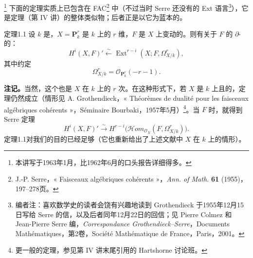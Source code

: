 \footnote{本讲写于1963年1月，比1962年6月的口头报告详细得多。}
下面的定理实质上已包含在 FAC\footnote{J.-P. Serre，« Faisceaux algébriques cohérents »，\emph{Ann. of Math.} \textbf{61} (1955)，197--278页。} 中（不过当时 Serre 还没有的 Ext 语言\footnote{编者注：喜欢数学史的读者会饶有兴趣地读到 Grothendieck 于1955年12月15日写给 Serre 的信，以及后者同年12月22日的回信；见 Pierre Colmez 和 Jean-Pierre Serre 编，\emph{Correspondance Grothendieck--Serre}，Documents Mathématiques，第2卷，Société Mathématique de France，Paris，2001。}），它是定理（第 IV 讲）的整体类似物；后者正是以它为蓝本的。
\begin{SGAresult}{定理}{1.1}
设 $k$ 是，$X=\mathbf P_k^r$ 是 $k$ 上的 $r$ 维，$F$ 是 $X$ 上变动的。则有关于 $F$ 的 $\partial$-的：
\[
 H^i(X,F)'\xleftarrow{\sim}\operatorname{Ext}^{r-i}(X;F,\Omega^r_{X/k}),\tag{1}
\]
其中约定
\[
 \Omega^r_{X/k}=\mathcal O_{\mathbf P_k^r}(-r-1).\tag{2}
\]
\end{SGAresult}
\textbf{注记。}当然，这个也是 $X$ 在 $k$ 上的 $r$ 次。在这种形式下，若 $X$ 是 $k$ 上且的，定理仍然成立（情形见 A. Grothendieck，« Théorèmes de dualité pour les faisceaux algébriques cohérents »，Séminaire Bourbaki，1957年5月）\footnote{更一般的定理，参见第 IV 讲末尾引用的 Hartshorne 讨论班。}。当 $F$ 时，就得到 Serre 定理
\[
 H^i(X,F)'\xrightarrow{\sim}H^{r-i}\bigl(\mathcal Hom_{\mathcal O_X}(F,\Omega^r_{X/k})\bigr).
\]
定理1.1对我们的目的已经足够（它也重新给出了上述文献中 $X$ 在 $k$ 上的情形）。

